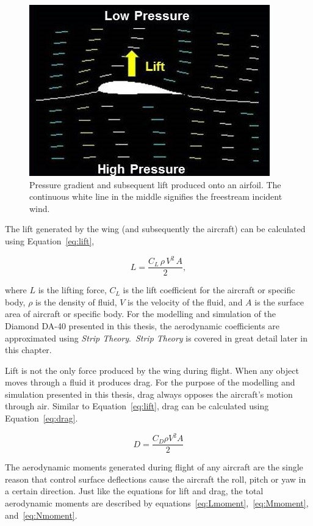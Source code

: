 \begin{figure}[!ht]\label{fig:pressuregradient}
    \centering
    \includegraphics[width=0.75\linewidth]{Figures/foillift.jpg}
    \caption{Pressure gradient and subsequent lift produced onto an airfoil. The continuous white line in the middle signifies the freestream incident wind.}
\end{figure}

The lift generated by the wing (and subsequently the aircraft) can be calculated using Equation~\ref{eq:lift},

\begin{equation}\label{eq:lift}
    L = \frac{C_L \, \rho \, V^2 \, A}{2},
\end{equation}

where \(L\) is the lifting force, \(C_L\) is the lift coefficient for the aircraft or specific body, \( \rho \) is the density of fluid, \(V\) is the velocity of the fluid, and \(A\) is the surface area of aircraft or specific body. For the modelling and simulation of the Diamond DA-40 presented in this thesis, the aerodynamic coefficients are approximated using \textit{Strip Theory}.~\textit{Strip Theory} is covered in great detail later in this chapter.

Lift is not the only force produced by the wing during flight. When any object moves through a fluid it produces drag. For the purpose of the modelling and simulation presented in this thesis, drag always opposes the aircraft's motion through air. Similar to Equation~\ref{eq:lift}, drag can be calculated using Equation~\ref{eq:drag}.

\begin{equation}\label{eq:drag}
    D = \frac{C_D \rho V^2 A}{2}
\end{equation}

The aerodynamic moments generated during flight of any aircraft are the single reason that control surface deflections cause the aircraft the roll, pitch or yaw in a certain direction. Just like the equations for lift and drag, the total aerodynamic moments are described by equations~\ref{eq:Lmoment},~\ref{eq:Mmoment}, and~\ref{eq:Nmoment}.

